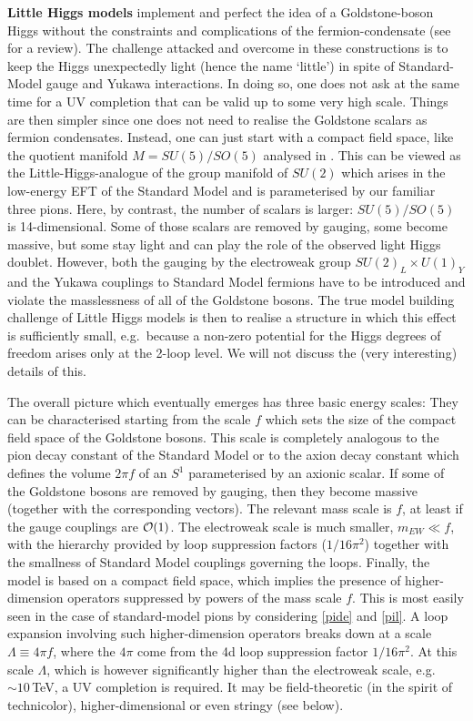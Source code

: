 \documentclass[12pt]{article}
\numberwithin{equation}{section}
\begin{document}
{\bf Little Higgs models} implement and perfect the idea of a Goldstone-boson Higgs without the constraints and complications of the fermion-condensate \cite{ArkaniHamed:2001nc, ArkaniHamed:2002pa, ArkaniHamed:2002qx} (see \cite{Schmaltz:2005ky} for a review). The challenge attacked and overcome in these constructions is to keep the Higgs unexpectedly light  (hence the name `little') in spite of Standard-Model gauge and Yukawa interactions. In doing so, one does not ask at the same time for a UV completion that can be valid up to some very high scale. Things are then simpler since one does not need to realise the Goldstone scalars as fermion condensates. Instead, one can just start with a compact field space, like the quotient manifold $M=SU(5)/SO(5)$ analysed in \cite{ArkaniHamed:2002qy}. This can be viewed as the Little-Higgs-analogue of the group manifold of $SU(2)$ which arises in the low-energy EFT of the Standard Model and is parameterised by our familiar three pions. Here, by contrast, the number of scalars is larger: $SU(5)/SO(5)$ is 14-dimensional. Some of those scalars are removed by gauging, some become massive, but some stay light and can play the role of the observed light Higgs doublet. However, both the gauging by the electroweak group $SU(2)_L\times U(1)_Y$ and the Yukawa couplings to Standard Model fermions have to be introduced and violate the masslessness of all of the Goldstone bosons. The true model building challenge of Little Higgs models is then to realise a structure in which this effect is sufficiently small, e.g.~because a non-zero potential for the Higgs degrees of freedom arises only at the 2-loop level. We will not discuss the (very interesting) details of this.

The overall picture which eventually emerges has three basic energy scales: They can be characterised starting from the scale $f$ which sets the size of the compact field space of the Goldstone bosons. This scale is completely analogous to the pion decay constant of the Standard Model or to the axion decay constant which defines the volume $2\pi f$ of an $S^1$ parameterised by an axionic scalar. If some of the Goldstone bosons are removed by gauging, then they become massive (together with the corresponding vectors). The relevant mass scale is $f$, at least if the gauge couplings are ${\cal O}(1)$. The electroweak scale is much smaller, $m_{EW}\ll f$, with the hierarchy provided by loop suppression factors ($1/16\pi^2$) together with the smallness of Standard Model couplings governing the loops. Finally, the model is based on a compact field space, which implies the presence of higher-dimension operators suppressed by powers of the mass scale $f$. This is most easily seen in the case of standard-model pions by considering \eqref{pide} and \eqref{pil}. A loop expansion involving such higher-dimension operators breaks down at a scale $\Lambda\equiv 4\pi f$, where the $4\pi$ come from the 4d loop suppression factor $1/16\pi^2$. At this scale $\Lambda$, which is however significantly higher than the electroweak scale, e.g.~$\sim 10\,$TeV, a UV completion is required. It may be field-theoretic (in the spirit of technicolor), higher-dimensional or even stringy (see below).
\end{document}
